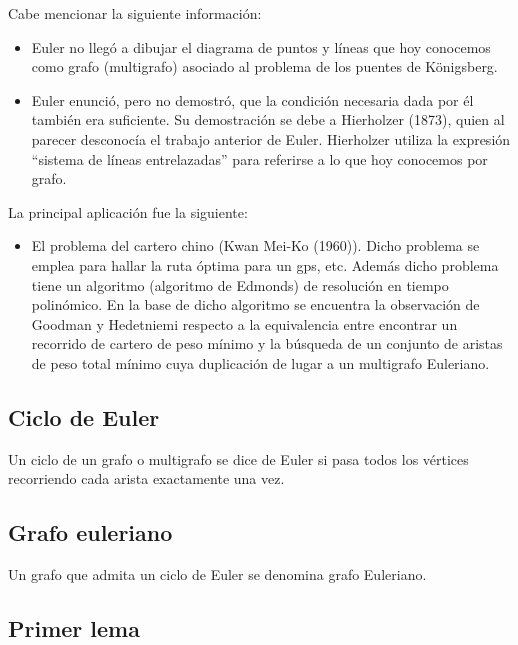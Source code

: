 Cabe mencionar la siguiente información:
\begin{itemize}
\item Euler no llegó a dibujar el diagrama de puntos y líneas que hoy conocemos como grafo (multigrafo) asociado al problema de los puentes de Königsberg.
\item Euler enunció, pero no demostró, que la condición necesaria dada por él también era suficiente. Su demostración se debe a Hierholzer (1873), quien al parecer desconocía el trabajo anterior de Euler. Hierholzer utiliza la expresión ``sistema de líneas entrelazadas'' para referirse a lo que hoy conocemos por grafo.
\end{itemize}

La principal aplicación fue la siguiente:
\begin{itemize}
\item El problema del cartero chino (Kwan Mei-Ko (1960)). Dicho problema se emplea para hallar la ruta óptima para un gps, etc. Además dicho problema tiene un algoritmo (algoritmo de Edmonds) de resolución en tiempo polinómico. En la base de dicho algoritmo se encuentra la observación de Goodman y Hedetniemi respecto a la equivalencia entre encontrar un recorrido de cartero de peso mínimo y la búsqueda de un conjunto de aristas de peso total mínimo cuya duplicación de lugar a un multigrafo Euleriano.
\end{itemize}

\subsection{Ciclo de Euler}

\begin{fondo}
Un ciclo de un grafo o multigrafo se dice de Euler si pasa todos los vértices recorriendo cada arista exactamente una vez.
\end{fondo}

\subsection{Grafo euleriano}

\begin{fondo}
Un grafo que admita un ciclo de Euler se denomina grafo Euleriano.
\end{fondo}

\subsection{Primer lema}

